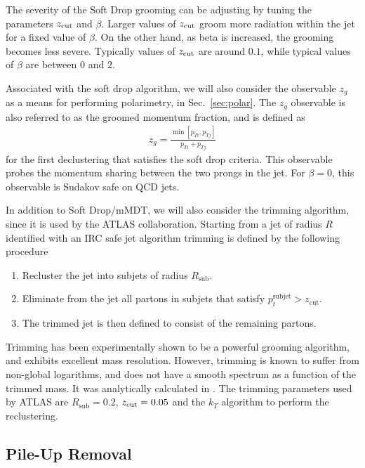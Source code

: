 \documentclass[11pt,letterpaper]{article}
\DeclareRobustCommand{\Sec}[1]{Sec.~\ref{#1}}
\newcommand{\zcut}{z_{\rm cut}}
\begin{document}
The severity of the Soft Drop grooming can be adjusting by tuning the parameters $\zcut$ and $\beta$. Larger values of $\zcut$ groom more radiation within the jet for a fixed value of $\beta$. On the other hand, as beta is increased, the grooming becomes less severe. Typically values of $\zcut$ are around $0.1$, while typical values of $\beta$ are between $0$ and $2$.




Associated with the soft drop algorithm, we will also consider the observable $z_g$ as a means for performing polarimetry, in \Sec{sec:polar}. The $z_g$ observable is also referred to as the groomed momentum fraction, and is defined as
\begin{align}
z_g=\frac{\min\left[ p_{Ti}, p_{Tj}  \right]}{p_{Ti}+p_{Tj}}
\end{align}
for the first declustering that satisfies the soft drop criteria. This observable probes the momentum sharing between the two prongs in the jet. For $\beta=0$, this observable is Sudakov safe on QCD jets.


In addition to Soft Drop/mMDT, we will also consider the trimming algorithm, since it is used by the ATLAS collaboration. Starting from a jet of radius $R$ identified with an IRC safe jet algorithm trimming is defined by the following procedure
\begin{enumerate}
\item Recluster the jet into subjets of radius $R_{\text{sub}}$.
\item Eliminate from the jet all partons in subjets that satisfy $p_t^{\text{subjet}} > z_{\text{cut}}$.
\item The trimmed jet is then defined to consist of the remaining partons.
\end{enumerate}
Trimming has been experimentally shown to be a powerful grooming algorithm, and exhibits excellent mass resolution. However, trimming is known to suffer from non-global logarithms, and does not have a smooth spectrum as a function of the trimmed mass. It was analytically calculated in \cite{Dasgupta:2013ihk}. The trimming parameters used by ATLAS are $R_{\text{sub}}=0.2$,  $ \zcut=0.05$ and the $k_T$ algorithm to perform the reclustering.

\subsection{Pile-Up Removal}\label{sec:pu_tech}
\end{document}
